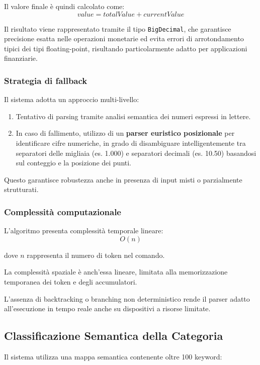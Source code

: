 \newpage
Il valore finale è quindi calcolato come:
\[
    value = totalValue + currentValue
\]

Il risultato viene rappresentato tramite il tipo \texttt{BigDecimal}, che garantisce precisione esatta nelle operazioni monetarie ed evita errori di arrotondamento tipici dei tipi floating-point, risultando particolarmente adatto per applicazioni finanziarie.

\subsubsection{Strategia di fallback}

Il sistema adotta un approccio multi-livello:

\begin{enumerate}
    \item Tentativo di parsing tramite analisi semantica dei numeri espressi in lettere.
    \item In caso di fallimento, utilizzo di un \textbf{parser euristico posizionale} per identificare cifre numeriche, in grado di disambiguare intelligentemente tra separatori delle migliaia (es. 1.000) e separatori decimali (es. 10.50) basandosi sul conteggio e la posizione dei punti.
\end{enumerate}

Questo garantisce robustezza anche in presenza di input misti o parzialmente strutturati.

\subsubsection{Complessità computazionale}

L'algoritmo presenta complessità temporale lineare:
\[
    O(n)
\]

dove $n$ rappresenta il numero di token nel comando.

La complessità spaziale è anch'essa lineare, limitata alla memorizzazione temporanea dei token e degli accumulatori.

L'assenza di backtracking o branching non deterministico rende il parser adatto all'esecuzione in tempo reale anche su dispositivi a risorse limitate.

\newpage
\subsection{Classificazione Semantica della Categoria}

Il sistema utilizza una mappa semantica contenente oltre 100 keyword:

